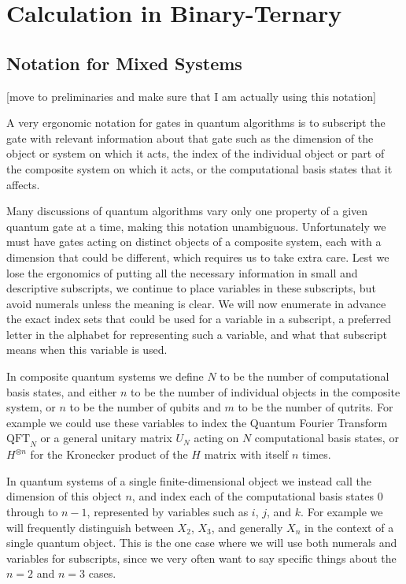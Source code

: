 \chapter[CALCULATION IN BINARY-TERNARY]{Calculation in Binary-Ternary}

\section{Notation for Mixed Systems}
[move to preliminaries and make sure that I am actually using this notation]

A very ergonomic notation for gates in quantum algorithms is to subscript the gate with relevant information about that gate such as the dimension of the object or system on which it acts, the index of the individual object or part of the composite system on which it acts, or the computational basis states that it affects.

Many discussions of quantum algorithms vary only one property of a given quantum gate at a time, making this notation unambiguous. Unfortunately we must have gates acting on distinct objects of a composite system, each with a dimension that could be different, which requires us to take extra care. Lest we lose the ergonomics of putting all the necessary information in small and descriptive subscripts, we continue to place variables in these subscripts, but avoid numerals unless the meaning is clear. We will now enumerate in advance the exact index sets that could be used for a variable in a subscript, a preferred letter in the alphabet for representing such a variable, and what that subscript means when this variable is used.

In composite quantum systems we define $N$ to be the number of computational basis states, and either $n$ to be the number of individual objects in the composite system, or $n$ to be the number of qubits and $m$ to be the number of qutrits. For example we could use these variables to index the Quantum Fourier Transform $\text{QFT}_N$ or a general unitary matrix $U_N$ acting on $N$ computational basis states, or $H^{\otimes n}$ for the Kronecker product of the $H$ matrix with itself $n$ times.

In quantum systems of a single finite-dimensional object we instead call the dimension of this object $n$, and index each of the computational basis states $0$ through to $n-1$, represented by variables such as $i$, $j$, and $k$. For example we will frequently distinguish between $X_2$, $X_3$, and generally $X_n$ in the context of a single quantum object. This is the one case where we will use both numerals and variables for subscripts, since we very often want to say specific things about the $n=2$ and $n=3$ cases.

